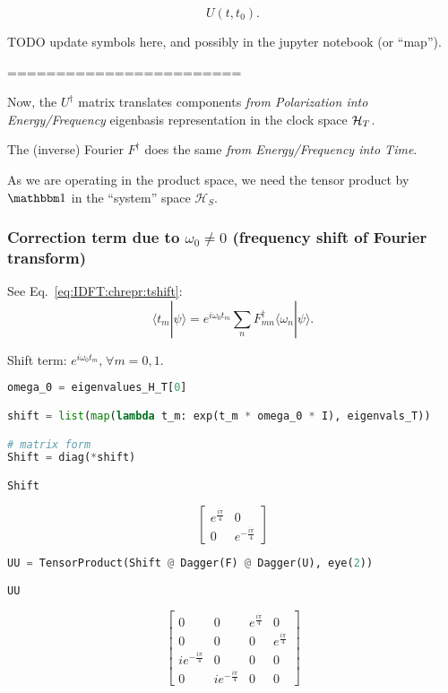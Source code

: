 $$U(t, t_0) .$$

TODO update symbols here, and possibly in the jupyter notebook (or ``map'').

========================

Now, the $U^{\dagger}$ matrix translates components \emph{from Polarization into Energy/Frequency} eigenbasis representation
in the clock space $\mathcal{H}_T$.

The (inverse) Fourier $F^{\dagger}$ does the same \emph{from Energy/Frequency into Time}.

As we are operating in the product space, we need the tensor product by $\idop$ in the ``system'' space $\mathcal{H}_S$.

\subsubsection*{Correction term due to $\omega_0 \neq 0$ (frequency shift of Fourier transform)}

See Eq.~\eqref{eq:IDFT:chrepr:tshift}:
\begin{equation}
  \langle{t_{m}}|{\psi}\rangle = e^{i\omega_{0}t_m} \sum_n F^{\dagger}_{mn} \langle{\omega_n}|{\psi}\rangle \text{.}
\end{equation}

Shift term: $e^{i\omega_{0}t_m} \text{,} \; \forall m = 0, 1$.

\begin{lstlisting}[language=Python]
omega_0 = eigenvalues_H_T[0]

shift = list(map(lambda t_m: exp(t_m * omega_0 * I), eigenvals_T))

# matrix form
Shift = diag(*shift)

Shift
\end{lstlisting}
$$
  \left[\begin{matrix}e^{\frac{i \pi}{4}} & 0\\0 & e^{- \frac{i \pi}{4}}\end{matrix}\right]
$$

\begin{lstlisting}[language=Python]
UU = TensorProduct(Shift @ Dagger(F) @ Dagger(U), eye(2))

UU
\end{lstlisting}
$$
  \left[\begin{matrix}0 & 0 & e^{\frac{i \pi}{4}} & 0\\0 & 0 & 0 & e^{\frac{i \pi}{4}}\\i e^{- \frac{i \pi}{4}} & 0 & 0 & 0\\0 & i e^{- \frac{i \pi}{4}} & 0 & 0\end{matrix}\right]
$$

